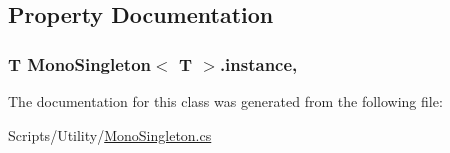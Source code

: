 \subsection{Property Documentation}
\subsubsection[{\texorpdfstring{instance}{instance}}]{\setlength{\rightskip}{0pt plus 5cm}T {\bf Mono\+Singleton}$<$ T $>$.instance\hspace{0.3cm}{\ttfamily [static]}, {\ttfamily [get]}}\hypertarget{class_mono_singleton_a288ee84660801f79a54dcdc5c8b58e31}{}\label{class_mono_singleton_a288ee84660801f79a54dcdc5c8b58e31}


The documentation for this class was generated from the following file\+:\begin{DoxyCompactItemize}
\item 
Scripts/\+Utility/\hyperlink{_mono_singleton_8cs}{Mono\+Singleton.\+cs}\end{DoxyCompactItemize}
